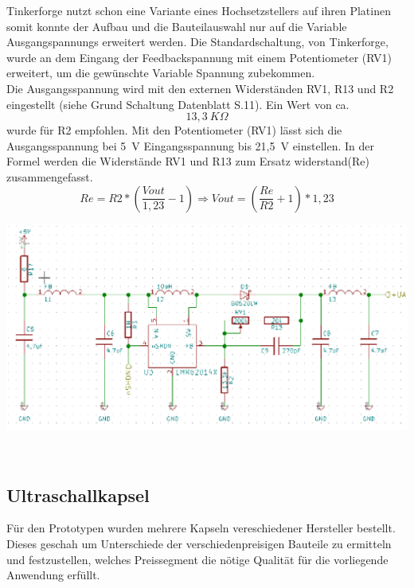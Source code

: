Tinkerforge nutzt schon eine Variante eines Hochsetzstellers auf ihren Platinen somit konnte der Aufbau und die Bauteilauswahl nur auf die Variable Ausgangspannungs erweitert werden. Die Standardschaltung, von Tinkerforge, wurde an dem Eingang der Feedbackspannung mit einem Potentiometer (RV1) erweitert, um die gewünschte Variable Spannung zubekommen.\\
Die Ausgangsspannung wird mit den externen Widerständen RV1, R13 und R2 eingestellt (siehe Grund Schaltung Datenblatt S.11). Ein Wert von ca. \[\displaystyle 13,3~K\Omega \] wurde für R2 empfohlen. Mit den Potentiometer (RV1) lässt sich die Ausgangsspannung bei 5~V Eingangsspannung bis 21,5~V einstellen. In der Formel werden die Widerstände RV1 und R13 zum Ersatz widerstand(Re) zusammengefasst.
\onehalfspacing \\
\[\displaystyle Re=R2*\left(\frac{Vout}{1,23}-1\right) \Rightarrow Vout=\left(\frac{Re}{R2}+1\right)*1,23\] 
\singlespacing
\begin{center}
\begin{minipage}{0.75\textwidth}
\includegraphics[width=1\textwidth%
]{Abbildungen/Pumpe.png}
\label{fig:Hochsetzsteller}
\end{minipage}\\
\end{center}

\subsection{Ultraschallkapsel}%
Für den Prototypen wurden mehrere Kapseln vereschiedener Hersteller bestellt. Dieses geschah um Unterschiede der verschiedenpreisigen Bauteile zu ermitteln und festzustellen, welches Preissegment die nötige Qualität für die vorliegende Anwendung erfüllt.


